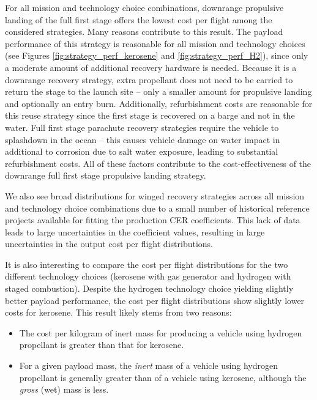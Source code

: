 \documentclass{iaf-iac}
\begin{document}
\begin{multicols}{2}
For all mission and technology choice combinations, downrange propulsive landing of the full first stage offers the lowest cost per flight among the considered strategies. Many reasons contribute to this result. The payload performance of this strategy is reasonable for all mission and technology choices (see Figures \ref{fig:strategy_perf_kerosene} and \ref{fig:strategy_perf_H2}), since only a moderate amount of additional recovery hardware is needed. Because it is a downrange recovery strategy, extra propellant does not need to be carried to return the stage to the launch site -- only a smaller amount for propulsive landing and optionally an entry burn. Additionally, refurbishment costs are reasonable for this reuse strategy since the first stage is recovered on a barge and not in the water. Full first stage parachute recovery strategies require the vehicle to splashdown in the ocean -- this causes vehicle damage on water impact in additional to corrosion due to salt water exposure, leading to substantial refurbishment costs. All of these factors contribute to the cost-effectiveness of the downrange full first stage propulsive landing strategy. 

We also see broad distributions for winged recovery strategies across all mission and technology choice combinations due to a small number of historical reference projects available for fitting the production CER coefficients. This lack of data leads to large uncertainties in the coefficient values, resulting in large uncertainties in the output cost per flight distributions. 

It is also interesting to compare the cost per flight distributions for the two different technology choices (kerosene with gas generator and hydrogen with staged combustion). Despite the hydrogen technology choice yielding slightly better payload performance, the cost per flight distributions show slightly lower costs for kerosene. This result likely stems from two reasons:

\begin{itemize}
  \item The cost per kilogram of inert mass for producing a vehicle using hydrogen propellant is greater than that for kerosene. 
  \item For a given payload mass, the \emph{inert} mass of a vehicle using hydrogen propellant is generally greater than of a vehicle using kerosene, although the \emph{gross} (wet) mass is less.
\end{itemize}


\end{multicols}
\end{document}
